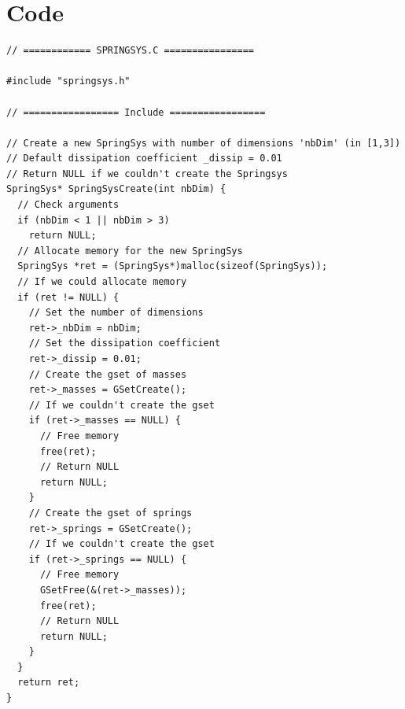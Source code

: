 \documentclass[12pt, a4paper]{article}
\begin{document}
\section{Code}

\begin{scriptsize}
\begin{ttfamily}
\begin{lstlisting}
// ============ SPRINGSYS.C ================

#include "springsys.h"

// ================= Include =================

// Create a new SpringSys with number of dimensions 'nbDim' (in [1,3])
// Default dissipation coefficient _dissip = 0.01
// Return NULL if we couldn't create the Springsys
SpringSys* SpringSysCreate(int nbDim) {
  // Check arguments
  if (nbDim < 1 || nbDim > 3)
    return NULL;
  // Allocate memory for the new SpringSys
  SpringSys *ret = (SpringSys*)malloc(sizeof(SpringSys));
  // If we could allocate memory
  if (ret != NULL) {
    // Set the number of dimensions
    ret->_nbDim = nbDim;
    // Set the dissipation coefficient
    ret->_dissip = 0.01;
    // Create the gset of masses
    ret->_masses = GSetCreate();
    // If we couldn't create the gset
    if (ret->_masses == NULL) {
      // Free memory
      free(ret);
      // Return NULL
      return NULL;
    }
    // Create the gset of springs
    ret->_springs = GSetCreate();
    // If we couldn't create the gset
    if (ret->_springs == NULL) {
      // Free memory
      GSetFree(&(ret->_masses));
      free(ret);
      // Return NULL
      return NULL;
    }
  }
  return ret;
}


\end{lstlisting}
\end{ttfamily}
\end{scriptsize}
\end{document}
